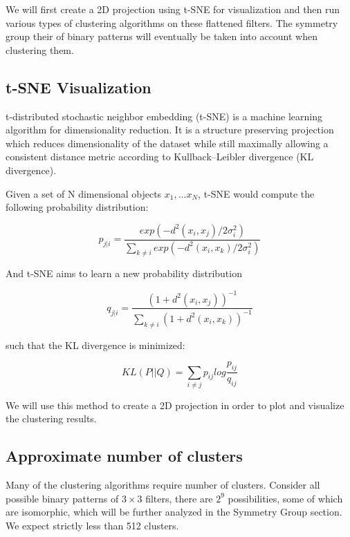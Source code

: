 \documentclass{article} %
\begin{document}
We will first create a 2D projection using t-SNE for visualization and then run various types of clustering algorithms on these flattened filters.
The symmetry group their of binary patterns will eventually be taken into account when clustering them.

\subsection{t-SNE Visualization}

t-distributed stochastic neighbor embedding (t-SNE) is a machine learning algorithm for dimensionality reduction. It is a structure preserving projection which reduces dimensionality of the dataset while still maximally allowing a consistent distance metric according to Kullback–Leibler divergence (KL divergence).

Given a set of N dimensional objects $x_1, ... x_N$, t-SNE would compute the following probability distribution:

\begin{equation}
p_{j|i} = \frac{exp(-d^2(x_i, x_j)/2\sigma_i^2)}{\sum_{k \neq i}exp(-d^2(x_i, x_k)/2\sigma_i^2)}
\end{equation}

And t-SNE aims to learn a new probability distribution

\begin{equation}
q_{j|i} = \frac{(1+d^2(x_i, x_j))^{-1}}{\sum_{k \neq i} (1+d^2(x_i, x_k))^{-1}}
\end{equation}

such that the KL divergence is minimized:

\begin{equation}
KL(P||Q) = \sum_{i \neq j} {p_{ij} log \frac{p_{ij}}{q_{ij}}}
\end{equation}

We will use this method to create a 2D projection in order to plot and visualize the clustering results.

\subsection{Approximate number of clusters}

Many of the clustering algorithms require number of clusters. Consider all possible binary patterns of $3 \times 3$ filters, there are $2^9$ possibilities, some of which are isomorphic, which will be further analyzed in the Symmetry Group section. We expect strictly less than 512 clusters.
\end{document}
